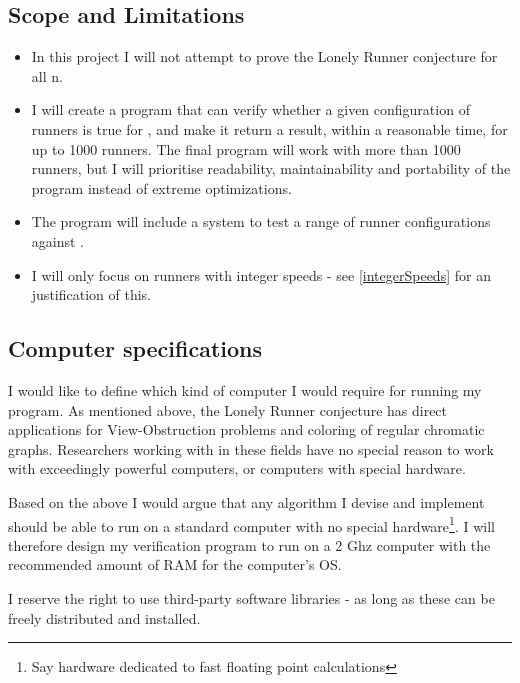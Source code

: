 \subsection{Scope and Limitations}
\begin{itemize}
\item In this project I will not attempt to prove the Lonely Runner conjecture for all n. 
\item I will create a program that can verify whether a given configuration of runners is true for , and make it return a result, within a reasonable time, for up to 1000 runners. The final program will work with more than 1000 runners, but I will prioritise readability, maintainability and portability of the program instead of extreme optimizations. 
\item The program will include a system to test a range of runner configurations against .
\item I will only focus on runners with integer speeds - see \ref{integerSpeeds} for an justification of this.
\end{itemize}

\subsection{Computer specifications}
\label{specs}
I would like to define which kind of computer I would require for running my program. As mentioned above, the Lonely Runner conjecture has direct applications for View-Obstruction problems and coloring of regular chromatic graphs. Researchers working with in these fields have no special reason to work with exceedingly powerful computers, or computers with special hardware.
 
Based on the above I would argue that any algorithm I devise and implement should be able to run on a standard computer with no special hardware\footnote{Say hardware dedicated to fast floating point calculations}. I will therefore design my verification program to run on a 2 Ghz computer with the recommended amount of RAM for the computer's OS. 

I reserve the right to use third-party software libraries - as long as these can be freely distributed and installed.

